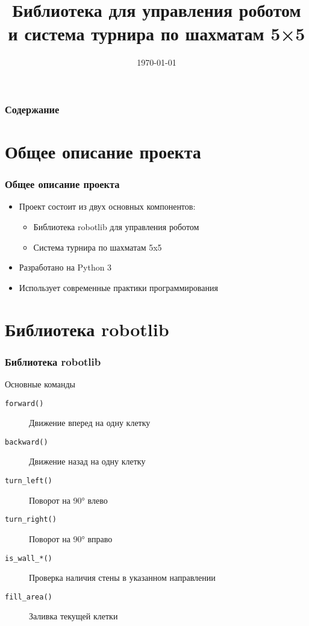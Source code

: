 \documentclass[14pt]{beamer}
\title{Библиотека для управления роботом и система турнира по шахматам 5×5}
\institute{Разработка автоматизированных лабораторных работ с элементами соревнования}
\date{\today}
\begin{document}
\begin{frame}
\titlepage
\end{frame}

\begin{frame}
\frametitle{Содержание}
\tableofcontents
\end{frame}

\section{Общее описание проекта}

\begin{frame}
\frametitle{Общее описание проекта}
\begin{itemize}
\item Проект состоит из двух основных компонентов:
\begin{itemize}
\item Библиотека robotlib для управления роботом
\item Система турнира по шахматам 5x5
\end{itemize}
\item Разработано на Python 3
\item Использует современные практики программирования
\end{itemize}
\end{frame}

\section{Библиотека robotlib}

\begin{frame}
\frametitle{Библиотека robotlib}
\begin{block}{Основные команды}
\begin{description}
\item[\texttt{forward()}] Движение вперед на одну клетку
\item[\texttt{backward()}] Движение назад на одну клетку
\item[\texttt{turn\_left()}] Поворот на 90° влево
\item[\texttt{turn\_right()}] Поворот на 90° вправо
\item[\texttt{is\_wall\_*()}] Проверка наличия стены в указанном направлении
\item[\texttt{fill\_area()}] Заливка текущей клетки
\end{description}
\end{block}
\end{frame}
\end{document}

